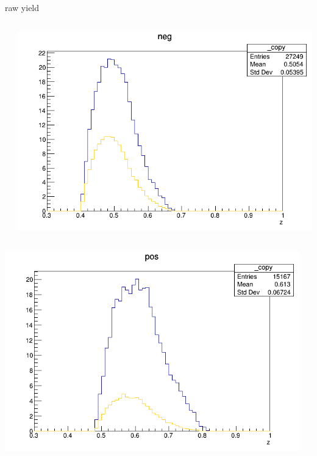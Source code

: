 \begin{frame}{raw yield}
\begin{columns}
\begin{column}[T]{0.25\textwidth}
\end{column}
\begin{column}[T]{0.25\textwidth}
\includegraphics[width = \textwidth]{results/yield/statistics/yield_x_Q2_z_0.50_3.979_0.50_neg.png}
\end{column}
\end{columns}
\begin{columns}
\begin{column}[T]{0.25\textwidth}
\includegraphics[width = \textwidth]{results/yield/statistics/yield_x_Q2_z_0.50_3.979_0.60_pos.png}
\end{column}
\begin{column}[T]{0.25\textwidth}

\end{column}
\end{columns}
\end{frame}
